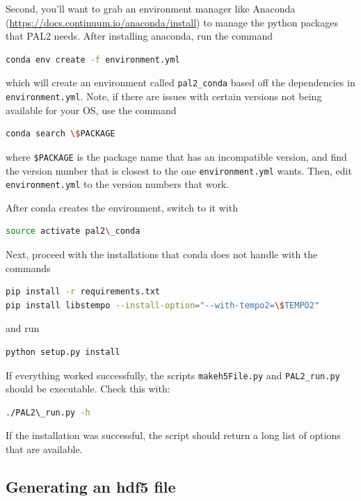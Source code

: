 \documentclass[12pt]{article}
\begin{document}
Second, you'll want to grab an environment manager like Anaconda
(\url{https://docs.continuum.io/anaconda/install}) to manage the python packages that
PAL2 needs. After installing anaconda, run the command
\\
\begin{lstlisting}[language=bash]
conda env create -f environment.yml
\end{lstlisting}
which will create an environment called \texttt{pal2\_conda} based off the dependencies in
\texttt{environment.yml}. Note, if there are issues with certain versions not being
available for your OS, use the command 
\\
\begin{lstlisting}[language=bash]
conda search \$PACKAGE
\end{lstlisting}
where \texttt{\$PACKAGE} is the package name that has an incompatible version, and find
the version number that is closest to the one \texttt{environment.yml} wants. Then, edit
\texttt{environment.yml} to the version numbers that work.
	
After conda creates the environment, switch to it with 
\\
\begin{lstlisting}[language=bash]
source activate pal2\_conda
\end{lstlisting}

Next, proceed with the installations that conda does not handle with the
commands
\\
\begin{lstlisting}[language=bash]
pip install -r requirements.txt
pip install libstempo --install-option="--with-tempo2=\$TEMPO2"
\end{lstlisting}
and run
\\
\begin{lstlisting}[language=bash]
python setup.py install
\end{lstlisting}

If everything worked successfully, the scripts \texttt{makeh5File.py} and
\texttt{PAL2\_run.py} should
be executable. Check this with:
\\
\begin{lstlisting}[language=bash]
./PAL2\_run.py -h
\end{lstlisting}
If the installation was successful, the script should return a long list of
options that are available.


\subsection{Generating an hdf5 file}
\end{document}
